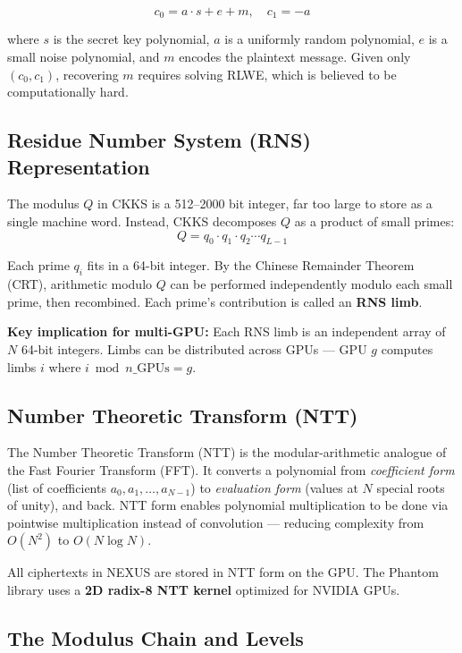 \documentclass[11pt,letterpaper]{article}
\begin{document}
\[
c_0 = a \cdot s + e + m, \quad c_1 = -a
\]

where $s$ is the secret key polynomial, $a$ is a uniformly random polynomial, $e$ is a small
noise polynomial, and $m$ encodes the plaintext message. Given only $(c_0, c_1)$, recovering
$m$ requires solving RLWE, which is believed to be computationally hard.

\subsection{Residue Number System (RNS) Representation}

The modulus $Q$ in CKKS is a 512--2000 bit integer, far too large to store as a single machine
word. Instead, CKKS decomposes $Q$ as a product of small primes:
\[
Q = q_0 \cdot q_1 \cdot q_2 \cdots q_{L-1}
\]

Each prime $q_i$ fits in a 64-bit integer. By the Chinese Remainder Theorem (CRT), arithmetic
modulo $Q$ can be performed independently modulo each small prime, then recombined. Each
prime's contribution is called an \textbf{RNS limb}.

\textbf{Key implication for multi-GPU:} Each RNS limb is an independent array of $N$
64-bit integers. Limbs can be distributed across GPUs --- GPU $g$ computes limbs $i$ where
$i \bmod n\_\text{GPUs} = g$.

\subsection{Number Theoretic Transform (NTT)}

The Number Theoretic Transform (NTT) is the modular-arithmetic analogue of the Fast Fourier
Transform (FFT). It converts a polynomial from \emph{coefficient form} (list of coefficients
$a_0, a_1, \ldots, a_{N-1}$) to \emph{evaluation form} (values at $N$ special roots of
unity), and back. NTT form enables polynomial multiplication to be done via pointwise
multiplication instead of convolution --- reducing complexity from $O(N^2)$ to $O(N \log N)$.

All ciphertexts in NEXUS are stored in NTT form on the GPU. The Phantom library uses a
\textbf{2D radix-8 NTT kernel} optimized for NVIDIA GPUs.

\subsection{The Modulus Chain and Levels}
\label{sec:modchain}
\end{document}
